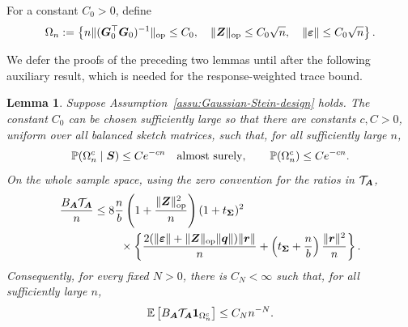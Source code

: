 \documentclass{article}
\theoremstyle{plain} %
\newtheorem{lemma}[theorem]{Lemma}
\theoremstyle{definition} %
\theoremstyle{definition} %
\begin{document}
For a constant $C_0>0$, define
\begin{align*}
    \Omega_n:=\left\{
       n\lVert(\boldsymbol{G}_0^\top\boldsymbol{G}_0)^{-1}\rVert_{\rm op}\leq C_0,\quad
       \lVert\boldsymbol{Z}\rVert_{\rm op}\leq C_0\sqrt n,\quad
       \lVert{\boldsymbol{\varepsilon} }\rVert\leq C_0\sqrt n
    \right\}.
\end{align*}

We defer the proofs of the preceding two lemmas until after the following
auxiliary result, which is needed for the response-weighted trace bound.

\begin{lemma}
\label{lem:balanced-exceptional-weight}
Suppose Assumption~\ref{assu:Gaussian-Stein-design} holds.  The constant
$C_0$ can be chosen
sufficiently large so that there are constants $c,C>0$, uniform over all
balanced sketch matrices,
such that, for all sufficiently large $n$,
\begin{align}
    {\mathbb{P}}(\Omega_n^c\mid\boldsymbol{S})\leq Ce^{-cn}\quad\text{almost surely},
    \qquad
    {\mathbb{P}}(\Omega_n^c)\leq Ce^{-cn}.
    \label{eq:balanced-exceptional-tail}
\end{align}
On the whole sample space, using the zero convention for the ratios in
$\mathcal T_{\boldsymbol{A}}$,
\begin{align}
    \frac{B_{\boldsymbol{A}}\mathcal T_{\boldsymbol{A}}}{n}
    \leq{}&8\frac nb
       \left(1+\frac{\lVert\boldsymbol{Z}\rVert_{\rm op}^2}{n}\right)
       (1+t_{\boldsymbol{\Sigma}})^2\notag\\
       &\quad\times\left\{
       \frac{2(\lVert{\boldsymbol{\varepsilon} }\rVert+\lVert\boldsymbol{Z}\rVert_{\rm op}\lVert\boldsymbol{q}\rVert)\lVert\boldsymbol{r}\rVert}{n}
       +\left(t_{\boldsymbol{\Sigma}}+\frac nb\right)\frac{\lVert\boldsymbol{r}\rVert^2}{n}
       \right\}.
    \label{eq:balanced-explicit-BT-polynomial}
\end{align}
Consequently, for every fixed $N>0$, there is $C_N<\infty$ such that, for all
sufficiently large $n$,
\begin{align}
    {\mathbb{E}}\left[
       B_{\boldsymbol{A}}\mathcal T_{\boldsymbol{A}}\boldsymbol{1}_{\Omega_n^c}
    \right]
    \leq C_Nn^{-N}.
    \label{eq:balanced-exceptional-BT}
\end{align}
\end{lemma}
\end{document}
